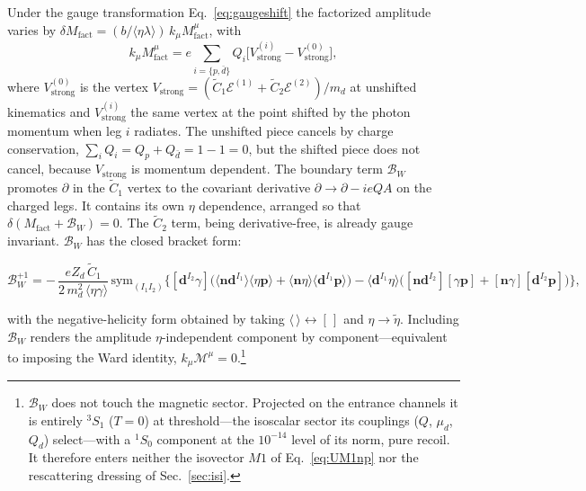 \documentclass[
  aps,prd,twocolumn,nofootinbib,superscriptaddress,
  longbibliography,floatfix,preprintnumbers
]{revtex4-2}
\newcommand{\Mone}{M1}
\newcommand{\ad}[2]{\langle #1 #2\rangle}
\newcommand{\sq}[2]{[#1 #2]}
\newcommand{\Cone}{\tilde{C}_{1}}
\newcommand{\Ctwo}{\tilde{C}_{2}}
\begin{document}
Under the gauge transformation Eq.~\eqref{eq:gaugeshift} the factorized amplitude varies by
$\delta M_{\mathrm{fact}}=(b/\ad{\eta}{\lambda})\,k_\mu M^{\mu}_{\mathrm{fact}}$,
with
\begin{equation}
  k_\mu M^\mu_{\mathrm{fact}}
  = e\sum_{i=\{p,\bar d\}} Q_{i}\Big[V^{(i)}_{\mathrm{strong}}
                                      -V^{(0)}_{\mathrm{strong}}\Big],
  \label{eq:ward}
\end{equation}
where $V^{(0)}_{\mathrm{strong}}$ is the vertex $V_{\mathrm{strong}}=(\Cone\mathcal{E}^{(1)}+\Ctwo\mathcal{E}^{(2)})/m_{d}$
at unshifted kinematics and
$V^{(i)}_{\mathrm{strong}}$ the same vertex at the point shifted by the photon momentum
when leg $i$ radiates. 
The unshifted piece cancels by charge conservation,
$\sum_{i}Q_{i}=Q_{p}+Q_{\bar d}=1-1=0$, but the shifted piece does not cancel, because
$V_{\mathrm{strong}}$ is momentum dependent. The boundary term $\mathcal{B}_W$ promotes $\partial$ in the $\Cone$ vertex
to the covariant derivative $\partial\to\partial-ieQA$ on the charged legs.  It contains its own $\eta$ dependence, arranged so that 
$\delta(M_{\mathrm{fact}}+\mathcal{B}_W)=0$.  The $\Ctwo$ term, being derivative-free, is already gauge invariant. 
$\mathcal{B}_W$ has the closed bracket form:
\begin{widetext}
\begin{equation}
  \mathcal{B}_{W}^{+1} = -\,\frac{e Z_{d}\,\Cone}{2\,m_{d}^{2}\,\ad{\eta}{\gamma}}\,
  \mathrm{sym}_{(I_{1}I_{2})}\Big\{
  \sq{\bm{d}^{I_{2}}}{\gamma}\big(\ad{\bm{n}}{\bm{d}^{I_{1}}}\ad{\eta}{\bm{p}}
  +\ad{\bm{n}}{\eta}\ad{\bm{d}^{I_{1}}}{\bm{p}}\big)
  -\ad{\bm{d}^{I_{1}}}{\eta}\big(\sq{\bm{n}}{\bm{d}^{I_{2}}}\sq{\gamma}{\bm{p}}
  +\sq{\bm{n}}{\gamma}\sq{\bm{d}^{I_{2}}}{\bm{p}}\big)\Big\},
  \label{eq:BWnpdg}
\end{equation}
\end{widetext}
with the negative-helicity form obtained by taking
$ \ad{\,}{}\!\leftrightarrow\!\sq{\,}{}$ and $\eta\to\tilde\eta$.
Including $\mathcal{B}_W$ renders the amplitude
$\eta$-independent component by component---equivalent to imposing the Ward identity, $k_\mu\mathcal{M}^\mu=0$.\footnote{$\mathcal{B}_{W}$
does not touch the magnetic sector. Projected on the entrance channels it is
entirely $^{3}S_{1}$ ($T=0$) at threshold---the isoscalar sector its
couplings ($Q$, $\mu_{d}$, $Q_{d}$) select---with a $^{1}S_{0}$ component at
the $10^{-14}$ level of its norm, pure recoil. It therefore enters neither
the isovector $\Mone$ of Eq.~\eqref{eq:UM1np} nor the rescattering dressing
of Sec.~\ref{sec:isi}.}
\end{document}
